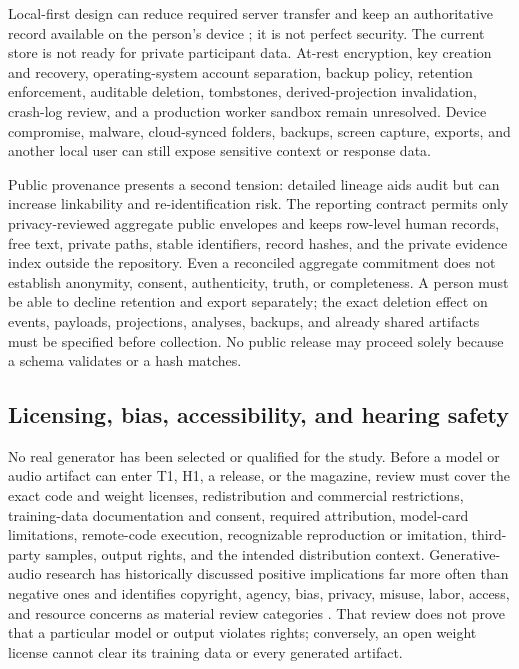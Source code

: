 Local-first design can reduce required server transfer and keep an authoritative
record available on the person's device \citep{kleppmann2019localfirst}; it is
not perfect security. The current store is not ready for private participant
data. At-rest encryption, key creation and recovery, operating-system account
separation, backup policy, retention enforcement, auditable deletion,
tombstones, derived-projection invalidation, crash-log review, and a production
worker sandbox remain unresolved. Device compromise, malware, cloud-synced
folders, backups, screen capture, exports, and another local user can still
expose sensitive context or response data.

Public provenance presents a second tension: detailed lineage aids audit but can
increase linkability and re-identification risk. The reporting contract permits
only privacy-reviewed aggregate public envelopes and keeps row-level human
records, free text, private paths, stable identifiers, record hashes, and the
private evidence index outside the repository. Even a reconciled aggregate
commitment does not establish anonymity, consent, authenticity, truth, or
completeness. A person must be able to decline retention and export separately;
the exact deletion effect on events, payloads, projections, analyses, backups,
and already shared artifacts must be specified before collection. No public
release may proceed solely because a schema validates or a hash matches.

\subsection{Licensing, bias, accessibility, and hearing safety}
\label{sec:ethics-licensing-accessibility}

No real generator has been selected or qualified for the study. Before a model
or audio artifact can enter T1, H1, a release, or the magazine, review must cover
the exact code and weight licenses, redistribution and commercial restrictions,
training-data documentation and consent, required attribution, model-card
limitations, remote-code execution, recognizable reproduction or imitation,
third-party samples, output rights, and the intended distribution context.
Generative-audio research has historically discussed positive implications far
more often than negative ones and identifies copyright, agency, bias, privacy,
misuse, labor, access, and resource concerns as material review categories
\citep{barnett2023ethical}. That review does not prove that a particular model
or output violates rights; conversely, an open weight license cannot clear its
training data or every generated artifact.

